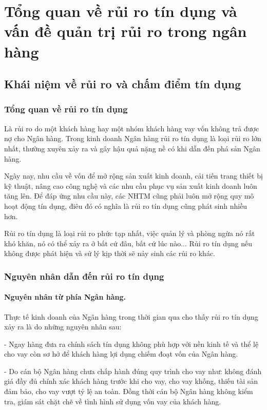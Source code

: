 \section{Tổng quan về rủi ro tín dụng và vấn đề quản trị rủi ro trong ngân hàng}
\subsection{Khái niệm về rủi ro và chấm điểm tín dụng}
\subsubsection{Tổng quan về rủi ro tín dụng}
Là rủi ro do một khách hàng hay một nhóm khách hàng vay vốn không trả được nợ cho Ngân hàng. Trong kinh doanh Ngân hàng rủi ro tín dụng là loại rủi ro lớn nhất, thường xuyên xảy ra và gây hậu quả nặng nề có khi dẫn đến phá sản Ngân hàng.

Ngày nay, nhu cầu về vốn để mở rộng sản xuất kinh doanh, cải tiến trang thiết bị kỹ thuật, nâng cao công nghệ và các nhu cầu phục vụ sản xuất kinh doanh luôn tăng lên. Để đáp ứng nhu cầu này, các NHTM cũng phải luôn mở rộng quy mô hoạt động tín dụng, điêu đó có nghĩa là rủi ro tín dụng cũng phát sinh nhiều hơn.

Rủi ro tín dụng là loại rủi ro phức tạp nhất, việc quản lý và phòng ngừa nó rất khó khăn, nó có thể xảy ra ở bất cứ đâu, bất cứ lúc nào... Rủi ro tín dụng nếu không được phát hiện và sử lý kịp thời sẽ nảy sinh các rủi ro khác.

\subsubsection{Nguyên nhân dẫn đến rủi ro tín dụng}
\paragraph{Nguyên nhân từ phía Ngân hàng.}
Thực tế kinh doanh của Ngân hàng trong thời gian qua cho thấy rủi ro tín dụng xảy ra là do những nguyên nhân sau:

- Ngay hàng đưa ra chính sách tín dụng không phù hợp với nền kinh tế và thể lệ cho vay còn sơ hở để khách hàng lợi dụng chiếm đoạt vốn của Ngân hàng.

- Do cán bộ Ngân hàng chưa chấp hành đúng quy trình cho vay như: không đánh giá đầy đủ chính xác khách hàng trước khi cho vay, cho vay khống, thiếu tài sản đảm bảo, cho vay vượt tỷ lệ an toàn. Đồng thời cán bộ Ngân hàng không kiểm tra, giám sát chặt chẽ về tình hình sử dụng vốn vay của khách hàng.

